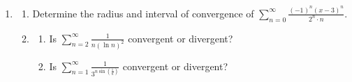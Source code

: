 \documentclass[a4paper, 12pt]{article}
\renewcommand{\headrulewidth}{0pt}
\begin{document}
\begin{enumerate}[leftmargin=*,label=\textbf{\arabic*.}]
\begin{enumerate}[leftmargin=*,label=\textbf{\alph*.}]
\item \begin{enumerate}[leftmargin=*,label=\textbf{\roman*.}]
\item The region $R$ is bounded by $y=x^3+x,\: y=2,$ and $x=0$. Find the volume of the object if $R$ is rotated around the $x$-axis.
\item The region $R$ is bounded by $y=x^3+x,\: y=2,$ and $x=0$. Find the volume of the object if $R$ is rotated around the $y$-axis.
\end{enumerate}
\end{enumerate}

\item \begin{enumerate}[leftmargin=*,label=\textbf{\alph*.}]
\item Determine the radius and interval of convergence of $\displaystyle\sum_{n=0}^\infty\frac{(-1)^n(x-3)^n}{2^n\cdot n}$.
\item \begin{enumerate}[leftmargin=*,label=\textbf{\roman*.}]
\item Is $\displaystyle\sum_{n=2}^\infty\frac1{n(\ln n)^2}$ convergent or divergent?
\item Is $\displaystyle\sum_{n=1}^\infty\frac1{3^{n\sin\left(\frac1n\right)}}$ convergent or divergent?

\end{enumerate}
\end{enumerate}
\end{enumerate}

\newpage
\pagestyle{fancy}
\renewcommand{\headrulewidth}{1pt}

\end{document}
